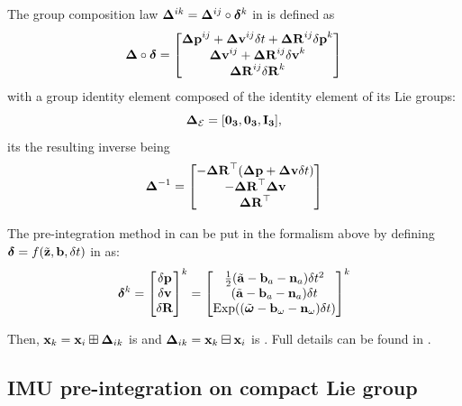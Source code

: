 The group composition law ${\bm \Delta}^{ik}={\bm \Delta}^{ij}\circ\bm\delta^k$ in  is defined as
%
\begin{equation} 
    \label{eq:composition_delta}
    {\bm \Delta} \circ {\bm \delta}
    =
    \begin{bmatrix}
        {\bm \Delta {\bf p}}^{ij} + {\bm \Delta {\bf v}}^{ij}\delta t + {\bm \Delta {\bf R}}^{ij}{\delta{\bf p}}^{k} \\
        {\bm \Delta {\bf v}}^{ij} + {\bm \Delta {\bf R}}^{ij}{\delta{\bf v}}^{k} \\
        {\bm \Delta {\bf R}}^{ij}{\delta{\bf R}}^{k} 
    \end{bmatrix}
\end{equation}
%
with a group identity element composed of the identity element of its Lie groups:
%
\begin{equation}
    {\bm \Delta}_{\mathcal{E}} = [\bf0_3, \bf0_3, {\bf I}_3],
\end{equation}
%
its the resulting inverse being
%
\begin{equation}
    {\bm \Delta}^{-1} =     \begin{bmatrix}
    - {\bm \Delta {\bf R}}^{\top}({\bm \Delta {\bf p}} + {\bm \Delta {\bf v}} \delta t) \\
    - {\bm \Delta {\bf R}}^{\top} {\bm \Delta {\bf v}} \\
      {\bm \Delta {\bf R}}^{\top}
    \end{bmatrix}
\end{equation}
%


The pre-integration method in  \cite{forster2017-TRO} can be put in the formalism above by defining 
$\bm\delta=f(\tilde{{\bf z}},{\bf b},\delta t)$ in  as:
%
\begin{align}
    \bm\delta^k = \begin{bmatrix}
    \delta{\bf p}\\\delta{\bf v}\\\delta{\bf R}
    \end{bmatrix}^k =
    \begin{bmatrix}
    \tfrac12(\tilde{{\bf a}}-{\bf b}_a-{\bf n}_a)\delta t^2 \\
    (\tilde{{\bf a}}-{\bf b}_a-{\bf n}_a)\delta t \\
    \operatorname*{Exp}((\tilde{{\bm \omega}}-{\bf b}_\omega-{\bf n}_\omega)\delta t)
    \end{bmatrix}^k
    \label{eq:delta_function}
\end{align}

Then, ${\bf x}_k={\bf x}_i\boxplus{\bm \Delta}_{ik}$ is \cite[eq.~32]{forster2017-TRO} and ${\bm \Delta}_{ik}={\bf x}_k\boxminus{\bf x}_i$ is \cite[eq.~33]{forster2017-TRO}. 
Full details can be found in \cite[Section 3.4]{atchuthan-18-thesis}.




\subsection{IMU pre-integration on compact Lie group}

